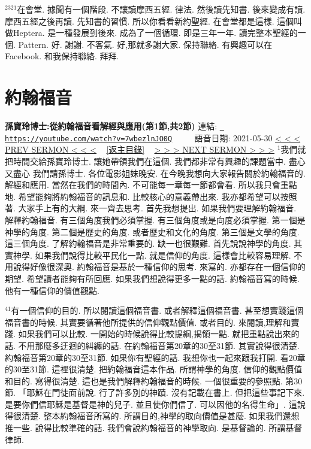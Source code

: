 \documentclass{book}
\begin{document}
$^{2321}$在會堂.
據聞有一個階段.
不讓讀摩西五經.
律法.
然後讀先知書.
後來變成有讀.
摩西五經之後再讀.
先知書的習慣.
所以你看看新約聖經.
在會堂都是這樣.
這個叫做Heptera.
是一種發展到後來.
成為了一個循環.
即是三年一年.
讀完整本聖經的一個.
Pattern.
好.
謝謝.
不客氣.
好,那就多謝大家.
保持聯絡.
有興趣可以在Facebook.
和我保持聯絡.
拜拜.
\newpage



\section{約翰福音}
\label{sec:7wbezlnJO0Q}
\textbf{孫寶玲博士:從約翰福音看解經與應用(第1節,共2節)}
\newline
\newline
連結: \href{https://youtube.com/watch?v=7wbezlnJO0Q}{\texttt{ https://youtube.com/watch?v=7wbezlnJO0Q}} ~~~~ 語音日期: 2021-05-30 
\newline
\newline
\hyperref[sec:WqYP3WEeIPg]{\small{< < < PREV SERMON < < <}}
~
\hyperref[sec:index]{\small{[返主目錄]}}
~
\hyperref[sec:tuRWhEkvI_Q]{\small{> > > NEXT SERMON > > >}}
\newline
\newline
$^{1}$我們就把時間交給孫寶玲博士.
讓她帶領我們在這個.
我們都非常有興趣的課題當中.
盡心又盡心 我們請孫博士.
各位電影姐妹晚安.
在今晚我想向大家報告關於約翰福音的.
解經和應用.
當然在我們的時間內.
不可能每一章每一節都會看.
所以我只會重點地.
希望能夠將約翰福音的訊息和.
比較核心的意義帶出來.
我亦都希望可以按照著.
大家手上有的大綱.
來一齊去思考.
首先我想提出.
如果我們要理解約翰福音.
解釋約翰福音.
有三個角度我們必須掌握.
有三個角度或是向度必須掌握.
第一個是神學的角度.
第二個是歷史的角度.
或者歷史和文化的角度.
第三個是文學的角度.
這三個角度.
了解約翰福音是非常重要的.
缺一也很艱難.
首先說說神學的角度.
其實神學.
如果我們說得比較平民化一點.
就是信仰的角度.
這樣會比較容易理解.
不用說得好像很深奧.
約翰福音是基於一種信仰的思考.
來寫的.
亦都存在一個信仰的期望.
希望讀者能夠有所回應.
如果我們想說得更多一點的話.
約翰福音寫的時候.
他有一種信仰的價值觀點.

$^{41}$有一個信仰的目的.
所以閱讀這個福音書.
或者解釋這個福音書.
甚至想實踐這個福音書的時候.
其實要循著他所提供的信仰觀點價值.
或者目的.
來閱讀,理解和實踐.
如果我們可以比較.
一開始的時候說得比較提綱,揭領一點.
就把重點說出來的話.
不用那麼多迂迴的糾纏的話.
在約翰福音第20章的30至31節.
其實說得很清楚.
約翰福音第20章的30至31節.
如果你有聖經的話.
我想你也一起來跟我打開.
看20章的30至31節.
這裡很清楚.
把約翰福音這本作品.
所謂神學的角度.
信仰的觀點價值和目的.
寫得很清楚.
這也是我們解釋約翰福音的時候.
一個很重要的參照點.
第30節.
「耶穌在門徒面前說.
行了許多別的神蹟.
沒有記載在書上.
但把這些事記下來.
是要你們信耶穌是基督是神的兒子.
並且使你們信了.
可以因他的名得生命」.
這說得很清楚.
整本約翰福音所寫的.
所謂目的,神學的取向價值是甚麼.
如果我們還想推一些.
說得比較準確的話.
我們會說約翰福音的神學取向.
是基督論的.
所謂基督律師.
\end{document}
